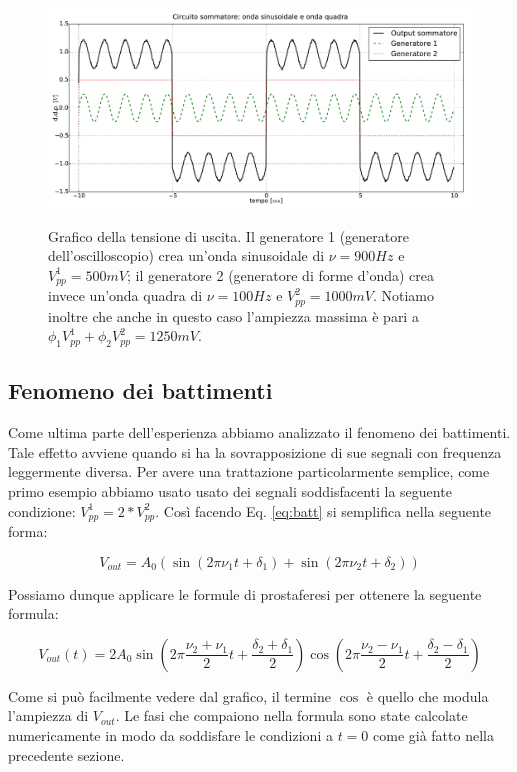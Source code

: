 \begin{figure}[H]
 \centering
   {\includegraphics[width=18cm]{../E01/latex/sinquad.pdf}}
 \caption{Grafico della tensione di uscita. Il generatore 1 (generatore dell'oscilloscopio) crea un'onda sinusoidale di $\nu=900 Hz$ e $V^1_{pp}=500 mV$; il generatore 2 (generatore di forme d'onda) crea invece un'onda quadra di $\nu=100 Hz$ e $V^2_{pp}=1000 mV$. Notiamo inoltre che anche in questo caso l'ampiezza massima è pari a $\phi_1 V^1_{pp}+\phi_2 V^2_{pp}=1250 mV$.}
 \label{gr:onde2}
\end{figure}


\subsection{Fenomeno dei battimenti}

Come ultima parte dell'esperienza abbiamo analizzato il fenomeno dei battimenti. Tale effetto avviene quando si ha la sovrapposizione di sue segnali con frequenza leggermente diversa. Per avere una trattazione particolarmente semplice, come primo esempio abbiamo usato usato dei segnali soddisfacenti la seguente condizione: $V^1_{pp}=2*V^2_{pp}$. Così facendo Eq. \ref{eq:batt} si semplifica nella seguente forma:

$$V_{out}=A_0 (\sin(2 \pi \nu_1t+ \delta_1)+\sin(2 \pi \nu_2t+ \delta_2))$$

Possiamo dunque applicare le formule di prostaferesi per ottenere la seguente formula:

$$V_{out}(t)=2A_0\sin(2\pi\frac{\nu_2+\nu_1}{2}t+\frac{\delta_2+\delta_1}{2})\cos(2\pi\frac{\nu_2-\nu_1}{2}t+\frac{\delta_2-\delta_1}{2})$$

Come si può facilmente vedere dal grafico, il termine $\cos$ è quello che modula l'ampiezza di $V_{out}$. Le fasi che compaiono nella formula sono state calcolate numericamente in modo da soddisfare le condizioni a $t=0$ come già fatto nella precedente sezione.


